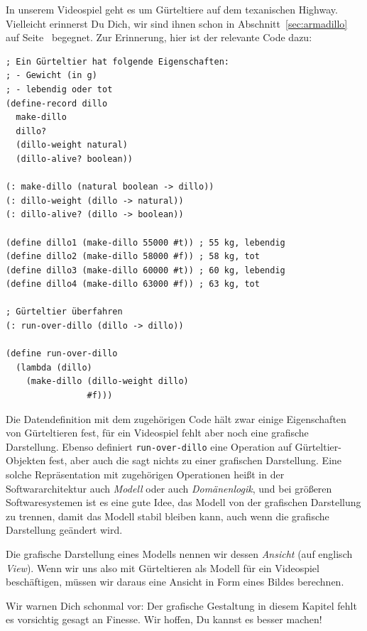 In unserem Videospiel geht es um Gürteltiere auf dem texanischen
Highway.  Vielleicht erinnerst Du Dich, wir sind ihnen schon in
Abschnitt~\ref{sec:armadillo} auf Seite~\pageref{sec:armadillo}
begegnet.  Zur Erinnerung, hier ist der relevante Code dazu:
%
\begin{lstlisting}
; Ein Gürteltier hat folgende Eigenschaften:
; - Gewicht (in g)
; - lebendig oder tot
(define-record dillo
  make-dillo
  dillo?
  (dillo-weight natural)
  (dillo-alive? boolean))

(: make-dillo (natural boolean -> dillo))
(: dillo-weight (dillo -> natural))
(: dillo-alive? (dillo -> boolean))

(define dillo1 (make-dillo 55000 #t)) ; 55 kg, lebendig 
(define dillo2 (make-dillo 58000 #f)) ; 58 kg, tot
(define dillo3 (make-dillo 60000 #t)) ; 60 kg, lebendig
(define dillo4 (make-dillo 63000 #f)) ; 63 kg, tot

; Gürteltier überfahren
(: run-over-dillo (dillo -> dillo))

(define run-over-dillo
  (lambda (dillo)
    (make-dillo (dillo-weight dillo)
                #f)))
\end{lstlisting}
%
Die Datendefinition mit dem zugehörigen Code hält zwar einige Eigenschaften
von Gürteltieren fest, für ein Videospiel fehlt aber noch eine
grafische Darstellung.  Ebenso definiert \lstinline{run-over-dillo}
eine Operation auf Gürteltier-Objekten fest, aber auch die sagt nichts
zu einer grafischen Darstellung.  Eine solche Repräsentation mit
zugehörigen Operationen heißt in der Softwararchitektur auch
\textit{Modell} oder auch
\textit{Domänenlogik}, und bei größeren Softwaresystemen
ist es eine gute Idee, das Modell von der grafischen Darstellung zu
trennen, damit das Modell stabil bleiben kann, auch wenn die grafische
Darstellung geändert wird.

Die grafische Darstellung eines Modells nennen wir dessen
\textit{Ansicht} (auf englisch
\textit{View}).  Wenn wir uns also mit Gürteltieren als
Modell für ein Videospiel beschäftigen, müssen wir daraus eine Ansicht
in Form eines Bildes berechnen.

Wir warnen Dich schonmal vor: Der grafische Gestaltung in diesem
Kapitel fehlt es vorsichtig gesagt an Finesse.  Wir hoffen, Du kannst
es besser machen!

